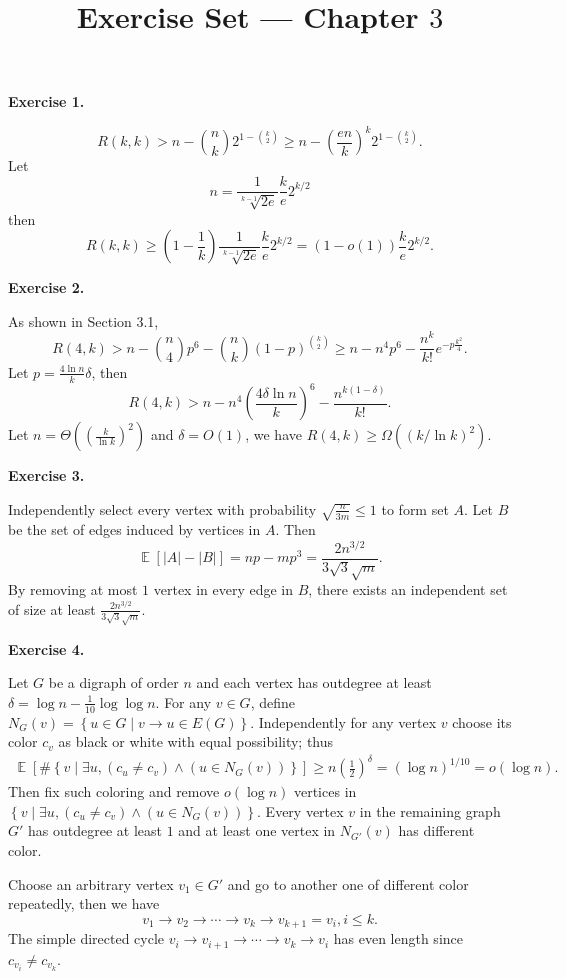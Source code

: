 \documentclass[a4paper]{article}
\title{Exercise Set --- Chapter $3$}
\date{}
\newenvironment{exercise}[1]{
	\par
	\noindent\textbf{Exercise #1.}\quad
}{
	\par
	\bigskip
}
\DeclareMathOperator{\E}{\mathbb E}
\newcommand{\pbra}[1]{\left( #1 \right)}
\newcommand{\cbra}[1]{\left\{ #1 \right\}}
\newcommand{\sbra}[1]{\left[ #1 \right]}
\begin{document}
\maketitle

\begin{exercise}{1}
    $$
    R(k,k)>n-\binom nk2^{1-\binom k2}\geq n-\pbra{\frac{en}k}^k2^{1-\binom k2}.
    $$
    Let 
    $$
    n=\frac1{\sqrt[k-1]{2e}}\frac ke2^{k/2}
    $$
    then
    $$
    R(k,k)\geq\pbra{1-\frac1k}\frac1{\sqrt[k-1]{2e}}\frac ke2^{k/2}=(1-o(1))\frac ke2^{k/2}.
    $$
\end{exercise}

\begin{exercise}{2}
    As shown in Section 3.1,
    $$
    R(4,k)>n-\binom n4p^6-\binom nk(1-p)^{\binom k2}\geq n-n^4p^6-\frac{n^k}{k!}e^{-p\frac{k^2}4}.
    $$
    Let $p=\frac{4\ln n}k\delta$, then 
    $$
    R(4,k)>n-n^4\pbra{\frac{4\delta\ln n}k}^6-\frac{n^{k(1-\delta)}}{k!}.
    $$
    Let $n=\Theta\pbra{\pbra{\frac k{\ln k}}^2}$ and $\delta=O(1)$, we have $R(4,k)\geq\Omega\pbra{(k/\ln k)^2}$.
\end{exercise}

\begin{exercise}{3}
    Independently select every vertex with probability $\sqrt{\frac n{3m}}\leq 1$ to form set $A$. 
    Let $B$ be the set of edges induced by vertices in
    $A$. Then 
    $$
    \E\sbra{|A|-|B|}=np-mp^3=\frac{2n^{3/2}}{3\sqrt3\sqrt m}.
    $$
    By removing at most $1$ vertex in every edge in $B$, there exists an independent set of size at least
    $\frac{2n^{3/2}}{3\sqrt3\sqrt m}$.
\end{exercise}

\begin{exercise}{4}
    Let $G$ be a digraph of order $n$ and each vertex has outdegree at least $\delta=\log n-\frac1{10}\log\log n$.
    For any $v\in G$, define $N_G(v)=\cbra{u\in G\middle|v\to u\in E(G)}$.
    Independently for any vertex $v$ choose its color $c_v$ as black or white with equal possibility; thus
    \begin{align*}
    \E\sbra{\#\cbra{v\middle|\exists u,\pbra{c_u\neq c_v}\land\pbra{u\in N_G(v)}}}
        \geq n\pbra{\frac12}^\delta=\pbra{\log n}^{1/10}=o(\log n).
    \end{align*}
    Then fix such coloring and remove $o(\log n)$ vertices in 
    $\cbra{v\middle|\exists u,\pbra{c_u\neq c_v}\land\pbra{u\in N_G(v)}}$. Every vertex $v$ in the remaining graph $G'$ 
    has outdegree at least $1$ and at least one vertex in $N_{G'}(v)$ has different color.
    
    Choose an arbitrary vertex $v_1\in G'$ and go to another one of different color repeatedly, then we have
    $$
    v_1\to v_2\to\cdots\to v_k\to v_{k+1}=v_i,i\leq k.
    $$
    The simple directed cycle $v_i\to v_{i+1}\to\cdots\to v_k\to v_i$ has even length since $c_{v_i}\neq c_{v_k}$.
\end{exercise}
\end{document}
